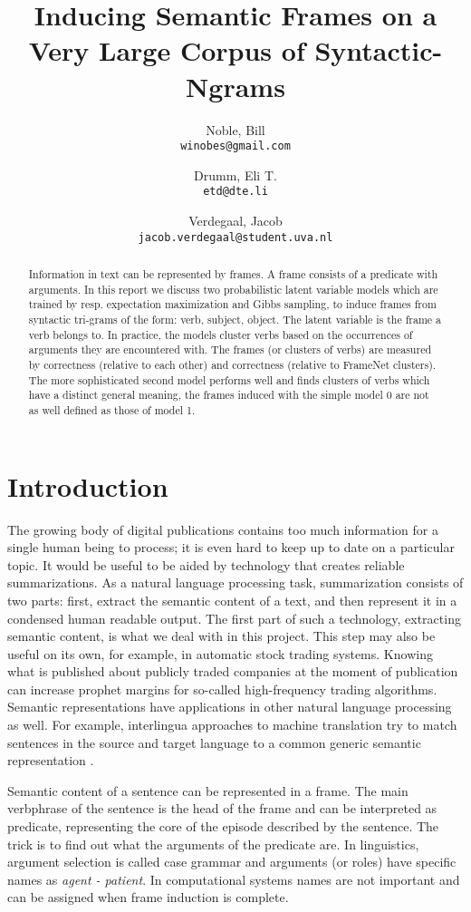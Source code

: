 \documentclass{article} %
\title{Inducing Semantic Frames on a Very Large Corpus of Syntactic-Ngrams}
\author{
    Noble, Bill\\
    \texttt{winobes@gmail.com}
    \and
    Drumm, Eli T.\\
    \texttt{etd@dte.li}
    \and
    Verdegaal, Jacob\\
    \texttt{jacob.verdegaal@student.uva.nl}
}
\begin{document}
\maketitle


\begin{abstract}
  Information in text can be represented by frames. A frame consists of a predicate with arguments. In this report we discuss two probabilistic latent variable models which are trained by resp. expectation maximization and Gibbs sampling, to induce frames from syntactic tri-grams of the form: verb, subject, object. The latent variable is the frame a verb belongs to. In practice, the models cluster verbs based on the occurrences of arguments they are encountered with. The frames (or clusters of verbs) are measured by correctness (relative to each other) and correctness (relative to FrameNet clusters). The more sophisticated second model performs well and finds clusters of verbs which have a distinct general meaning, the frames induced with the simple model 0 are not as well defined as those of model 1. 
\end{abstract}

\section{Introduction}
The growing body of digital publications contains too much information for a single human being to process; it is even hard to keep up to date on a particular topic. It would be useful to be aided by technology that creates reliable summarizations. As a natural language processing task, summarization consists of two parts: first, extract the semantic content of a text, and then represent it in a condensed human readable output. The first part of such a technology, extracting semantic content, is what we deal with in this project. This step may also be useful on its own, for example, in automatic stock trading systems. Knowing what is published about publicly traded companies at the moment of publication can increase prophet margins for so-called high-frequency trading algorithms. Semantic representations have applications in other natural language processing as well. For example, interlingua approaches to machine translation try to match sentences in the source and target language to a common generic semantic representation \cite{boas2005}.

Semantic content of a sentence can be represented in a frame. The main verbphrase of the sentence is the head of the frame and can be interpreted as predicate, representing the core of the episode described by the sentence. The trick is to find out what the arguments of the predicate are. In linguistics, argument selection is called case grammar \citep{dowty1991} and arguments (or roles) have specific names as \textit{agent - patient}. In computational systems names are not important and can be assigned when frame induction is complete.
\end{document}
